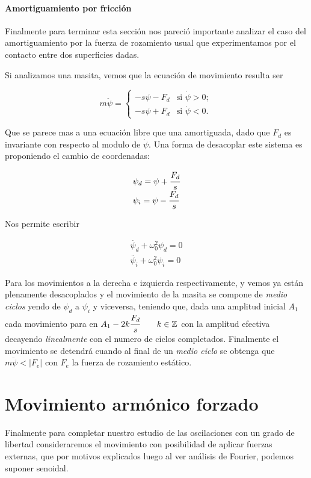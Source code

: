 \documentclass[a4paper,spanish]{article}
\def\Z {\mathbb{Z}}
\numberwithin{equation}{section}
\begin{document}
\paragraph{Amortiguamiento por fricci\'on}
Finalmente para terminar esta secci\'on nos pareci\'o importante analizar el caso del amortiguamiento por la fuerza de rozamiento usual que experimentamos por el contacto entre dos superficies dadas.

Si analizamos una masita, vemos que la ecuaci\'on de movimiento resulta ser

\[ m\ddot{\psi} = \left\{ \begin{array}{ll}
         -s\psi -F_d & \mbox{si $\dot{\psi}>0$};\\
         -s\psi +F_d & \mbox{si $\dot{\psi}<0$}.\end{array} \right. \] 

Que se parece mas a una ecuaci\'on libre que una amortiguada, dado que $F_d$ es invariante con respecto al modulo de $\dot{\psi}$. Una forma de desacoplar este sistema es proponiendo el cambio de coordenadas:

\begin{equation*}
\begin{array}{l}
\psi_d=\psi+\cfrac{F_d}{s} \\
\psi_i=\psi-\cfrac{F_d}{s}
\end{array}
\end{equation*}

Nos permite escribir

\begin{equation*}
\begin{array}{l}
\ddot{\psi_d}+\omega_0 ^2\psi_d=0 \\
\ddot{\psi_i}+\omega_0 ^2\psi_i=0
\end{array}
\end{equation*}

Para los movimientos a la derecha e izquierda respectivamente, y vemos ya est\'an plenamente desacoplados y el movimiento de la masita se compone de \textit{medio ciclos} yendo de $\psi_d$ a $\psi_i$ y viceversa, teniendo que, dada una amplitud inicial $A_1$ cada movimiento para en $A_1-2k\cfrac{F_d}{s} \qquad k \in \Z $ con la amplitud efectiva decayendo \textit{linealmente} con el numero de ciclos completados. Finalmente el movimiento se detendr\'a cuando al final de un \textit{medio ciclo} se obtenga que $m\ddot{\psi}<\vert{F_e}\vert$ con $F_e$ la fuerza de rozamiento est\'atico.

\section{Movimiento arm\'onico forzado}
Finalmente para completar nuestro estudio de las oscilaciones con un grado de libertad consideraremos el movimiento con posibilidad de aplicar fuerzas externas, que por motivos explicados luego al ver an\'alisis de Fourier, podemos suponer senoidal.
\end{document}
